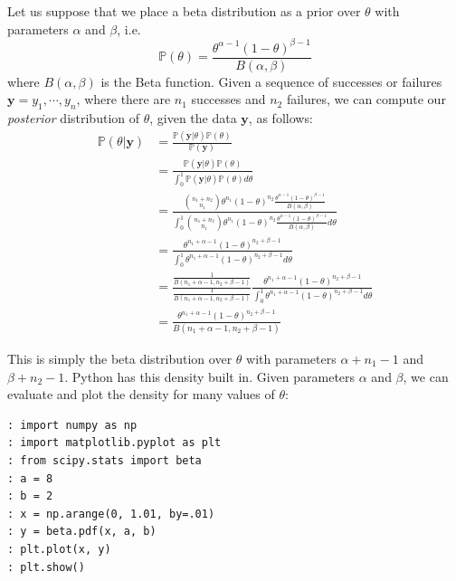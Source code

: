 Let us suppose that we place a beta distribution as a prior over $\theta$ with parameters $\alpha$ and $\beta$, i.e. 
\begin{equation*}
\mathbb{P}(\theta) = \frac{\theta^{\alpha - 1}(1 - \theta)^{\beta - 1}}{B(\alpha,\beta)}
\end{equation*}
where $B(\alpha,\beta)$ is the Beta function. Given a sequence of successes or failures $\mathbf{y} = y_{1},\cdots,y_{n}$, where there are $n_{1}$ successes and $n_{2}$ failures, we can compute our \emph{posterior} distribution of $\theta$, given the data $\mathbf{y}$, as follows:
\begin{align*}
\mathbb{P}(\theta | \mathbf{y}) & = \frac{\mathbb{P}(\mathbf{y} | \theta)\mathbb{P}(\theta)}{\mathbb{P}(\mathbf{y})} \\
& = \frac{\mathbb{P}(\mathbf{y} | \theta)\mathbb{P}(\theta)}{\int_{0}^{1} \mathbb{P}(\mathbf{y} | \theta)\mathbb{P}(\theta) d\theta} \\
& = \frac{{n_{1} + n_{2} \choose n_{1}} \theta^{n_{1}}(1-\theta)^{n_{2}} \frac{\theta^{\alpha - 1}(1 - \theta)^{\beta - 1}}{B(\alpha,\beta)}}{\int_{0}^{1} {n_{1} + n_{2} \choose n_{1}} \theta^{n_{1}}(1-\theta)^{n_{2}} \frac{\theta^{\alpha - 1}(1 - \theta)^{\beta - 1}}{B(\alpha,\beta)} d\theta} \\
& = \frac{ \theta^{n_{1} + \alpha - 1}(1-\theta)^{n_{2} + \beta - 1}}{\int_{0}^{1} \theta^{n_{1} + \alpha - 1}(1-\theta)^{n_{2} + \beta - 1} d\theta} \\
& = \frac{\frac{1}{B(n_{1} + \alpha - 1, n_{2} + \beta - 1)}}{\frac{1}{B(n_{1} + \alpha - 1, n_{2} + \beta - 1)}} \frac{ \theta^{n_{1} + \alpha - 1}(1-\theta)^{n_{2} + \beta - 1}}{\int_{0}^{1} \theta^{n_{1} + \alpha - 1}(1-\theta)^{n_{2} + \beta - 1} d\theta} \\
& = \frac{ \theta^{n_{1} + \alpha - 1}(1-\theta)^{n_{2} + \beta - 1}}{B(n_{1} + \alpha - 1, n_{2} + \beta - 1)}
\end{align*}

This is simply the beta distribution over $\theta$ with parameters $\alpha + n_{1} - 1$ and $\beta + n_{2} - 1$. Python has this density built in. Given parameters $\alpha$ and $\beta$, we can evaluate and plot the density for many values of $\theta$:
\begin{lstlisting}
: import numpy as np
: import matplotlib.pyplot as plt
: from scipy.stats import beta
: a = 8
: b = 2
: x = np.arange(0, 1.01, by=.01)
: y = beta.pdf(x, a, b)
: plt.plot(x, y)
: plt.show()
\end{lstlisting}

